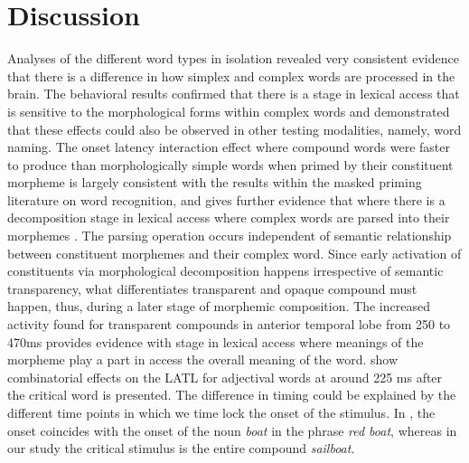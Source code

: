 \documentclass{frontiersSCNS}
\begin{document}
\section{Discussion}
	Analyses of the different word types in isolation revealed very consistent evidence that there is a difference in how simplex and complex words are processed in the brain. The behavioral results confirmed that there is a stage in lexical access that is sensitive to the morphological forms within complex words and demonstrated that these effects could also be observed in other testing modalities, namely, word naming. The onset latency interaction effect where compound words were faster to produce than morphologically simple words when primed by their constituent morpheme is largely consistent with the results within the masked priming literature on word recognition, and gives further evidence that where there is a decomposition stage in lexical access where complex words are parsed into their morphemes \citep{Rastle:2004, Taft:2004, Morris:2007, McCormick:2008, Fiorentino:2009}. The parsing operation occurs independent of semantic relationship between constituent morphemes and their complex word. 
	Since early activation of constituents via morphological decomposition happens irrespective of semantic transparency, what differentiates transparent and opaque compound must happen, thus, during a later stage of morphemic composition.
The increased activity found for transparent compounds in anterior temporal lobe from 250 to 470ms provides evidence with stage in lexical access where meanings of the morpheme play a part in access the overall meaning of the word. \cite{Bemis:2011} show combinatorial effects on the LATL for adjectival words at around 225 ms after the critical word is presented.  The difference in timing could be explained by the different time points in which we time lock the onset of the stimulus. In \cite{Bemis:2011}, the onset coincides with the onset of the noun \textit{boat} in the phrase \textit{red boat}, whereas in our study the critical stimulus is the entire compound \textit{sailboat}.
\end{document}
